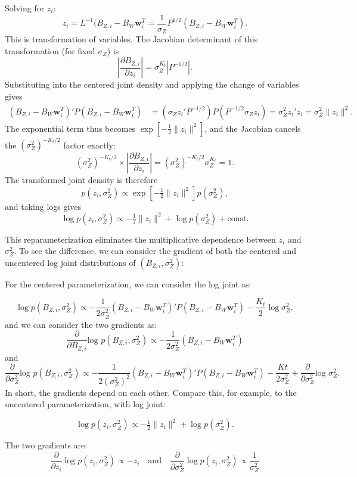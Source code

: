 Solving for \(z_i\):
\[
z_i = L^{-1}(B_{Z,i} - B_W \boldsymbol{w}_i^T = \frac{1}{\sigma_Z} P^{1/2} (B_{Z,i} - B_W\boldsymbol{w}_i^T).
\]
This is transformation of variables.  The Jacobian determinant of this transformation (for fixed $\sigma_Z$) is
\[
\left|\frac{\partial B_{Z,i}}{\partial z_i}\right| = \sigma_Z^{K_t} |P^{-1/2}|.
\]
Substituting into the centered joint density and applying the change of variables gives
\[
\begin{split}
(B_{Z,i}-B_W \boldsymbol{w}_i^T)'P(B_{Z,i}-B_W \boldsymbol{w}_i^T)
&= (\sigma_Z z_i' P^{-1/2})P(P^{-1/2} \sigma_Z z_i)
= \sigma_Z^2 z_i' z_i = \sigma_Z^2 \|z_i\|^2.
\end{split}
\]
The exponential term thus becomes $\exp[-\tfrac{1}{2}\|z_i\|^2]$, and the Jacobian cancels the $(\sigma_Z^2)^{-K_t/2}$ factor exactly:
\[
(\sigma_Z^2)^{-K_t/2}\times\left|\frac{\partial B_{Z,i}}{\partial z_i}\right|
= (\sigma_Z^2)^{-K_t/2} \sigma_Z^{K_t} = 1.
\]
The transformed joint density is therefore
\[
p(z_i, \sigma_Z^2) \propto \exp\!\left[-\tfrac{1}{2}\|z_i\|^2\right] p(\sigma_Z^2),
\]
and taking logs gives
\[
\log p(z_i,\sigma_Z^2) \propto -\tfrac{1}{2}\|z_i\|^2 + \log p(\sigma_Z^2) + \text{const.}
\]

This reparameterization eliminates the multiplicative dependence between $z_i$ and $\sigma_Z^2$.  
To see the difference, we can consider the gradient of both the centered and uncentered log joint distributions of 
\((B_{Z,i},\sigma_Z^2)\):

For the centered parameterization, we can consider the log joint as:

\[
\log p(B_{Z,i}, \sigma_Z^2)\propto -\frac{1}{2\sigma_Z^2}
(B_{Z,i}-B_W \boldsymbol{w}_i^T)'P(B_{Z,i}-B_W \boldsymbol{w}_i^T)
-\frac{K_t}{2}\log\sigma_Z^2,
\]
and we can consider the two gradients as:
\[
\frac{\partial}{\partial B_{Z,i}}\text{log } p(B_{Z,i},\sigma_Z^2) \propto -\frac{1}{2\sigma_Z^2}(B_{Z,i}-B_W \boldsymbol{w}_i^T)
\]
and
\[
\frac{\partial}{\partial \sigma_Z^2}\text{log } p(B_{Z,i},\sigma_Z^2) \propto -\frac{1}{2(\sigma_Z^2)^2}
(B_{Z,i}-B_W \boldsymbol{w}_i^T)'P(B_{Z,i}-B_W \boldsymbol{w}_i^T) - \frac{Kt}{2\sigma_Z^2} + \frac{\partial}{\partial \sigma_Z^2}\text{log }\sigma_Z^2.
\]
In short, the gradients depend on each other.  Compare this, for example, to the uncentered parameterization, with log joint:

\[
\log p(z_i,\sigma_Z^2) \propto -\tfrac{1}{2}\|z_i\|^2 + \log p(\sigma_Z^2).
\]

The two gradients are:
\[
\frac{\partial}{\partial z_i}\log p(z_i,\sigma_Z^2) \propto -z_i\quad \text{and}\quad \frac{\partial}{\partial \sigma_Z^2}\log p(z_i,\sigma_Z^2) \propto \frac{1}{\sigma_Z^2}
\]

